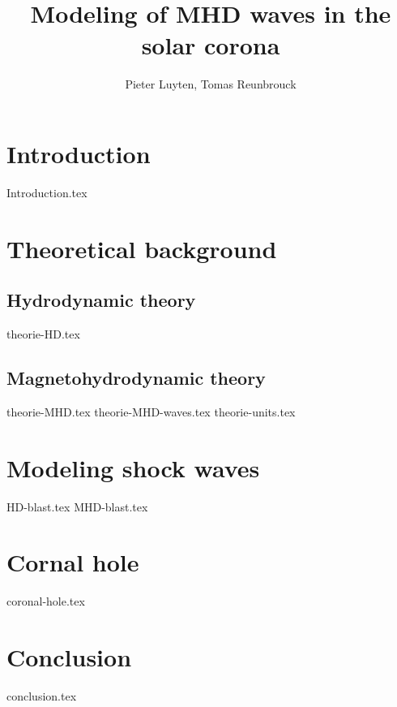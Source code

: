 \documentclass[a4paper]{article}
\title{Modeling of MHD waves in the solar corona}
\author{Pieter Luyten, Tomas Reunbrouck}
\begin{document}
\maketitle
\newpage
\tableofcontents
\newpage

\section{Introduction}
{Introduction.tex}


\section{Theoretical background}
\subsection{Hydrodynamic theory}
{theorie-HD.tex}
\subsection{Magnetohydrodynamic theory}
{theorie-MHD.tex}
{theorie-MHD-waves.tex}
{theorie-units.tex}
\newpage

\section{Modeling shock waves}
{HD-blast.tex}
{MHD-blast.tex}
\newpage

\section{Cornal hole}
{coronal-hole.tex}
\newpage

\section{Conclusion}
{conclusion.tex}

%
\end{document}
